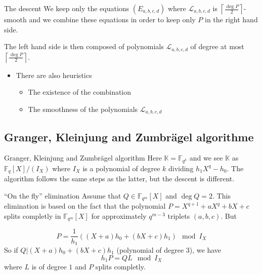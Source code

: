 \documentclass[xcolor=x11names,compress]{beamer}
\theoremstyle{break}
\theoremstyle{sc}
\theoremstyle{definition}
\theoremstyle{remark}
\begin{document}
\begin{frame}{The descent}
  We keep only the equations $(E_{a, b, c, d})$ where
  $\mathcal L_{a, b, c, d}$ is
  $\left\lceil \frac{\deg P}{2}\right\rceil$-smooth and we combine these equations
  in order to keep only $P$ in the right hand side.

  The left hand side is then composed of polynomials $\mathcal L_{a, b, c, d}$
  of degree at most $\left\lceil \frac{\deg P}{2}\right\rceil$.

  \begin{itemize}
    \item There are also heuristics
      \begin{itemize}
        \item The existence of the combination
        \item The smoothness of the polynomials $\mathcal L_{a, b, c, d}$
      \end{itemize}
  \end{itemize}
\end{frame}


\subsection{Granger, Kleinjung and Zumbrägel algorithme}

\begin{frame}{Granger, Kleinjung and Zumbrägel algorithm}
  Here $\mathbb{K}=\mathbb{F}_{q^k}$ and we see $\mathbb{K}$ as
  $\mathbb{F}_q[X]/(I_X)$ where $I_X$ is a polynomial of degree $k$ dividing
  $h_1X^q-h_0$. The algorithm follows the same steps as the latter, but the
  descent is different.
\end{frame}

\begin{frame}{``On the fly'' elimination}
  Assume that $Q\in \mathbb{F}_{q^m}[X]$ and $\deg Q = 2$. This elimination is
  based on the fact that the polynomial $P = X^{q+1}+aX^q+bX+c$ splits completly
  in $\mathbb{F}_{q^m}[X]$ for approximately $q^{m-3}$ triplets $(a, b, c)$. But
  
  \[
    P = \frac{1}{h_1}((X+a)h_0 + (bX+c)h_1)\mod I_X
  \]
  So if $Q| (X+a)h_0 + (bX+c)h_1$ (polynomial of degree $3$), we have 
  \[
    h_1P=QL \mod I_X
  \]
  where $L$ is of degree $1$ and $P$ splits completly.

\end{frame}
\end{document}
